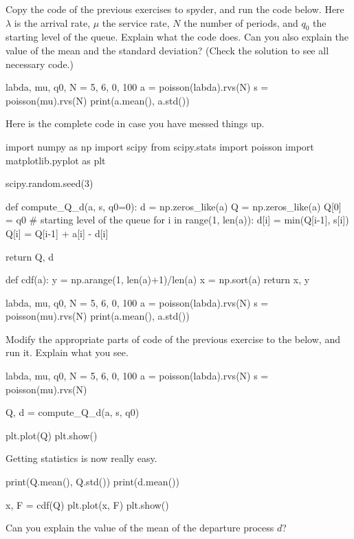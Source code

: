 \documentclass{scrartcl}
\begin{document}
\begin{exercise}
Copy the code of the previous exercises to spyder, and run the code below. Here $\lambda$ is the arrival rate, $\mu$ the service rate, $N$ the number of periods, and $q_0$ the starting level of the queue. Explain what the code does. Can you also explain the value of the mean and the standard deviation? (Check the solution to see all necessary code.) 

  \begin{pyblock}
labda, mu, q0, N = 5, 6, 0, 100
a = poisson(labda).rvs(N)
s = poisson(mu).rvs(N)
print(a.mean(), a.std())
\end{pyblock}
\begin{solution}
  Here is the complete code in case you have messed things up.

\begin{pyblock}
import numpy as np
import scipy
from scipy.stats import poisson
import matplotlib.pyplot as plt

scipy.random.seed(3) 


def compute_Q_d(a, s, q0=0):
    d = np.zeros_like(a)
    Q = np.zeros_like(a)
    Q[0] = q0 # starting level of the queue
    for i in range(1, len(a)):
        d[i] = min(Q[i-1], s[i])
        Q[i] = Q[i-1] + a[i] - d[i]

    return Q, d

def cdf(a):
    y = np.arange(1, len(a)+1)/len(a)
    x = np.sort(a)
    return x, y
  

labda, mu, q0, N = 5, 6, 0, 100
a = poisson(labda).rvs(N)
s = poisson(mu).rvs(N)
print(a.mean(), a.std())
\end{pyblock}

\end{solution}
\end{exercise}

\begin{exercise}
  Modify  the appropriate parts of  code of the previous exercise to the below,  and run it. Explain what you see.

  \begin{pyblock}
labda, mu, q0, N = 5, 6, 0, 100
a = poisson(labda).rvs(N)
s = poisson(mu).rvs(N)

Q, d = compute_Q_d(a, s, q0)

plt.plot(Q)
plt.show()
  \end{pyblock}
\end{exercise}

\begin{exercise}
  Getting statistics is now really easy.
  \begin{pyblock}
print(Q.mean(), Q.std())
print(d.mean())
    
x, F = cdf(Q)
plt.plot(x, F)
plt.show()
  \end{pyblock}
Can you explain the value of the mean of the departure process $d$?
\end{exercise}
\end{document}
